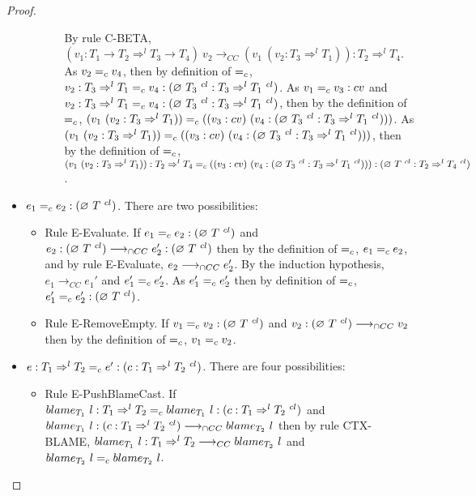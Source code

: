 \documentclass[a4paper]{article}
\begin{document}
\begin{proof}
\begin{itemize}
\begin{itemize}
\begin{itemize}
            By rule C-BETA, $(v_1 : T_1 \rightarrow T_2 \Rightarrow^l T_3 \rightarrow T_4)\ v_2 \longrightarrow_{CC} (v_1\ (v_2 : T_3 \Rightarrow^l T_1)) : T_2 \Rightarrow^l T_4$.
            As $v_2 =_c v_4$, then by definition of $=_c$, $v_2 : T_3 \Rightarrow^l T_1 =_c v_4 : (\varnothing\ T_3\ ^{cl} : T_3 \Rightarrow^l T_1\ ^{cl})$.
            As $v_1 =_c v_3 : cv$ and $v_2 : T_3 \Rightarrow^l T_1 =_c v_4 : (\varnothing\ T_3\ ^{cl} : T_3 \Rightarrow^l T_1\ ^{cl})$, then by the definition of $=_c$, $(v_1\ (v_2 : T_3 \Rightarrow^l T_1)) \equalityCasts ((v_3 : cv)\ (v_4 : (\emptycast{T_3}{cl} : T_3 \Rightarrow^l T_1\ ^{cl})))$.
            As $(v_1\ (v_2 : T_3 \Rightarrow^l T_1)) \equalityCasts ((v_3 : cv)\ (v_4 : (\emptycast{T_3}{cl} : T_3 \Rightarrow^l T_1\ ^{cl})))$, then by the definition of $=_c$, $(v_1\ (v_2 : T_3 \Rightarrow^l T_1)) : T_2 \Rightarrow^l T_4 =_c ((v_3 : cv)\ (v_4 : (\varnothing\ T_3\ ^{cl} : T_3 \Rightarrow^l T_1\ ^{cl}))) : (\varnothing\ T\ ^{cl} : T_2 \Rightarrow^l T_4\ ^{cl})$.
        \end{itemize}
    \end{itemize}
    \item $e_1 =_c e_2 : (\varnothing\ T\ ^{cl})$.
    There are two possibilities:
    \begin{itemize}
        \item Rule E-Evaluate.
        If $e_1 =_c e_2 : (\varnothing\ T\ ^{cl})$ and $e_2 : (\varnothing\ T\ ^{cl}) \longrightarrow_{\cap CC} e_2' : (\varnothing\ T\ ^{cl})$ then by the definition of $=_c$, $e_1 =_c e_2$, and by rule E-Evaluate, $e_2 \longrightarrow_{\cap CC} e_2'$.
        By the induction hypothesis, $e_1 \longrightarrow_{CC} e_1'$ and $e_1' =_c e_2'$.
        As $e_1' =_c e_2'$ then by definition of $=_c$, $e_1' =_c e_2' : (\varnothing\ T\ ^{cl})$.
        \item Rule E-RemoveEmpty.
        If $v_1 =_c v_2 : (\varnothing\ T\ ^{cl})$ and $v_2 : (\varnothing\ T\ ^{cl}) \longrightarrow_{\cap CC} v_2$ then by the definition of $=_c$, $v_1 =_c v_2$.
    \end{itemize}
    \item $e : T_1 \Rightarrow^l T_2 =_c e' : (c : T_1 \Rightarrow^l T_2\ ^{cl})$.
    There are four possibilities:
    \begin{itemize}
        \item Rule E-PushBlameCast.
        If $\blame{T_1}{l} : T_1 \Rightarrow^l T_2 \equalityCasts \blame{T_1}{l} : (c : T_1 \Rightarrow^l T_2\ ^{cl})$ and $blame_{T_1}\ l : (c : T_1 \Rightarrow^l T_2\ ^{cl}) \longrightarrow_{\cap CC} blame_{T_2}\ l$ then by rule CTX-BLAME, $blame_{T_1}\ l : T_1 \Rightarrow^l T_2 \longrightarrow_{CC} blame_{T_2}\ l$ and $blame_{T_2}\ l =_c blame_{T_2}\ l$.

\end{itemize}
\end{itemize}
\end{proof}
\end{document}
